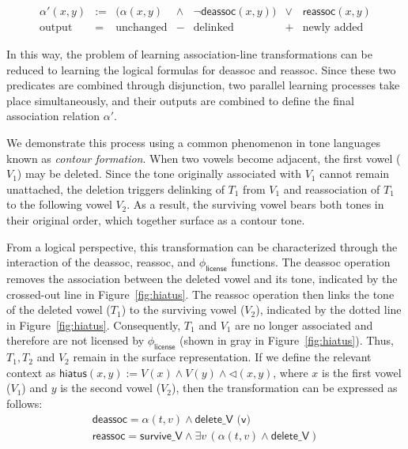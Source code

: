 \documentclass[pmlr]{jmlr}%
\begin{document}
\[
\begin{array}{rclclcl}
\alpha'(x,y)
&:=&
\bigl(
\alpha(x,y)
&\land&
\neg \textsf{deassoc}(x,y)
\bigr)
&\lor
&
\textsf{reassoc}(x,y)
\\[0.5em]

\text{output}
&=&
\text{unchanged}
&-&
\text{delinked}
&+&
\text{newly added}
\end{array}
\]

In this way, the problem of learning association-line 
transformations can be reduced to learning the logical 
formulas for \textsf{deassoc} and \textsf{reassoc}. 
Since these two predicates are combined through disjunction, 
two parallel learning processes take place simultaneously, 
and their outputs are combined to define the final 
association relation $\alpha'$.

We demonstrate this process using a common phenomenon in tone languages
known as \textit{contour formation}. When two vowels become adjacent,
the first vowel ($V_1$) may be deleted. Since the tone originally associated
with $V_1$ cannot remain unattached, the deletion triggers delinking of
$T_1$ from $V_1$ and reassociation of $T_1$ to the following vowel $V_2$.
As a result, the surviving vowel bears both tones in their original order,
which together surface as a contour tone.

From a logical perspective, this transformation can be characterized
through the interaction of the \textsf{deassoc},
\textsf{reassoc}, and $\phi_{\textsf{license}}$ functions.
The \textsf{deassoc} operation removes the association between the
deleted vowel and its tone, indicated by the crossed-out line in
Figure~\ref{fig:hiatus}. The \textsf{reassoc} operation then links the
tone of the deleted vowel ($T_1$) to the surviving vowel ($V_2$),
indicated by the dotted line in Figure~\ref{fig:hiatus}. Consequently,
$T_1$ and $V_1$ are no longer associated and therefore are not
licensed by $\phi_{\textsf{license}}$ (shown in gray in
Figure~\ref{fig:hiatus}). Thus, $T_1, T_2$ and $V_2$ remain in the
surface representation. If we define the relevant context as
$\textsf{hiatus}(x,y) := V(x) \land V(y) \land \lhd(x,y)$,
where $x$ is the first vowel ($V_1$) and $y$ is the second vowel ($V_2$),
then the transformation can be expressed as follows:
\[
\begin{array}{ll}
	\textsf{deassoc} = \alpha(t,v) \land \textsf{delete\_V (v)}\\
	
	\textsf{reassoc} = 	\textsf{survive\_V} \land\exists v\,(\alpha(t,v)\land \textsf{delete\_V})
\end{array}
\]
\end{document}
